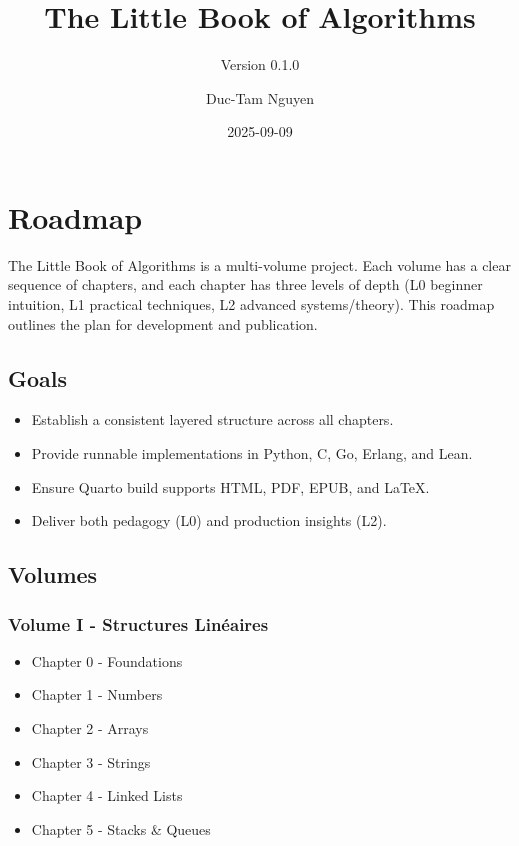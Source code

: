 \documentclass[
  letterpaper,
  DIV=11,
  numbers=noendperiod]{scrreprt}
\title{The Little Book of Algorithms}
\subtitle{Version 0.1.0}
\author{Duc-Tam Nguyen}
\date{2025-09-09}
\providecommand{\tightlist}{%
  \setlength{\itemsep}{0pt}\setlength{\parskip}{0pt}}
\renewcommand*\contentsname{Table of contents}
\newcommand\contentsname{Table of contents}
\begin{document}
\maketitle

\renewcommand*\contentsname{Table of contents}
{
\hypersetup{linkcolor=}
\setcounter{tocdepth}{2}
\tableofcontents
}


\chapter{Roadmap}\label{roadmap}

The Little Book of Algorithms is a multi-volume project. Each volume has
a clear sequence of chapters, and each chapter has three levels of depth
(L0 beginner intuition, L1 practical techniques, L2 advanced
systems/theory). This roadmap outlines the plan for development and
publication.

\section{Goals}\label{goals}

\begin{itemize}
\tightlist
\item
  Establish a consistent layered structure across all chapters.
\item
  Provide runnable implementations in Python, C, Go, Erlang, and Lean.
\item
  Ensure Quarto build supports HTML, PDF, EPUB, and LaTeX.
\item
  Deliver both pedagogy (L0) and production insights (L2).
\end{itemize}

\section{Volumes}\label{volumes}

\subsection{Volume I - Structures
Linéaires}\label{volume-i---structures-linuxe9aires}

\begin{itemize}
\tightlist
\item
  Chapter 0 - Foundations
\item
  Chapter 1 - Numbers
\item
  Chapter 2 - Arrays
\item
  Chapter 3 - Strings
\item
  Chapter 4 - Linked Lists
\item
  Chapter 5 - Stacks \& Queues
\end{itemize}
\end{document}
